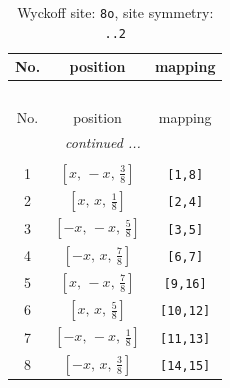 \documentclass[fleqn,8pt]{jsarticle}
\begin{document}
\begin{longtable}{ccc}
\caption{Wyckoff site: {\tt 8o}, site symmetry: {\tt ..2}}
 \\
 \hline \hline
No. & position & mapping \\ \hline \endfirsthead

\multicolumn{2}{l}{\tablename\ \thetable{}} \\
 \hline \hline
No. & position & mapping \\ \hline \endhead

 \hline \hline
\multicolumn{2}{r}{\footnotesize\it continued ...} \\ \endfoot

 \hline \hline
\multicolumn{2}{r}{} \\ \endlastfoot

1 & $\left[ x,\, - x,\, \frac{3}{8} \right]$ & {\tt [1,8]} \\ \hline
2 & $\left[ x,\, x,\, \frac{1}{8} \right]$ & {\tt [2,4]} \\ \hline
3 & $\left[ - x,\, - x,\, \frac{5}{8} \right]$ & {\tt [3,5]} \\ \hline
4 & $\left[ - x,\, x,\, \frac{7}{8} \right]$ & {\tt [6,7]} \\ \hline
5 & $\left[ x,\, - x,\, \frac{7}{8} \right]$ & {\tt [9,16]} \\ \hline
6 & $\left[ x,\, x,\, \frac{5}{8} \right]$ & {\tt [10,12]} \\ \hline
7 & $\left[ - x,\, - x,\, \frac{1}{8} \right]$ & {\tt [11,13]} \\ \hline
8 & $\left[ - x,\, x,\, \frac{3}{8} \right]$ & {\tt [14,15]} \\
\end{longtable}
\renewcommand{\arraystretch}{1.2}
\end{document}
